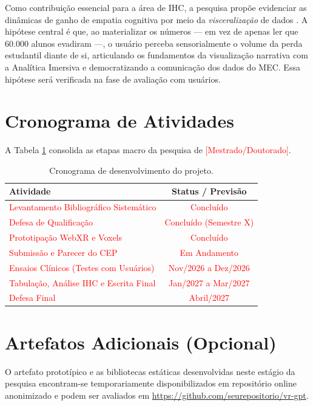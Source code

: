 \documentclass[12pt]{article}
\begin{document}
Como contribuição essencial para a área de IHC, a pesquisa propõe evidenciar as dinâmicas de ganho de empatia cognitiva por meio da \textit{visceralização} de dados \cite{lee2021visceralization}. A hipótese central é que, ao materializar os números --- em vez de apenas ler que $60.000$ alunos evadiram ---, o usuário perceba sensorialmente o volume da perda estudantil diante de si, articulando os fundamentos da visualização narrativa \cite{segel2010narrative} com a Analítica Imersiva e democratizando a comunicação dos dados do MEC. Essa hipótese será verificada na fase de avaliação com usuários.

\section{Cronograma de Atividades}

A Tabela \ref{tab:cronograma} consolida as etapas macro da pesquisa de \textcolor{red}{[Mestrado/Doutorado]}.

\begin{table}[ht]
\centering
\caption{Cronograma de desenvolvimento do projeto.}
\label{tab:cronograma}
\begin{tabular}{|l|c|}
\hline
\textbf{Atividade} & \textbf{Status / Previsão} \\ \hline
\textcolor{red}{Levantamento Bibliográfico Sistemático} & \textcolor{red}{Concluído} \\ \hline
\textcolor{red}{Defesa de Qualificação} & \textcolor{red}{Concluído (Semestre X)} \\ \hline
\textcolor{red}{Prototipação WebXR e Voxels} & \textcolor{red}{Concluído} \\ \hline
\textcolor{red}{Submissão e Parecer do CEP} & \textcolor{red}{Em Andamento} \\ \hline
\textcolor{red}{Ensaios Clínicos (Testes com Usuários)} & \textcolor{red}{Nov/2026 a Dez/2026} \\ \hline
\textcolor{red}{Tabulação, Análise IHC e Escrita Final} & \textcolor{red}{Jan/2027 a Mar/2027} \\ \hline
\textcolor{red}{Defesa Final} & \textcolor{red}{Abril/2027} \\ \hline
\end{tabular}
\end{table}

\section{Artefatos Adicionais (Opcional)}
O artefato prototípico e as bibliotecas estáticas desenvolvidas neste estágio da pesquisa encontram-se temporariamente disponibilizados em repositório online anonimizado e podem ser avaliados em \textcolor{red}{\url{https://github.com/seurepositorio/vr-gpt}}.



\end{document}
